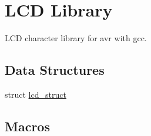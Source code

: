 \hypertarget{group__ex4__lcd}{\section{L\-C\-D Library}
\label{group__ex4__lcd}
}


L\-C\-D character library for avr with gcc.  


\subsection*{Data Structures}
\begin{DoxyCompactItemize}
\item 
struct \hyperlink{structlcd__struct}{lcd\-\_\-struct}
\end{DoxyCompactItemize}
\subsection*{Macros}
